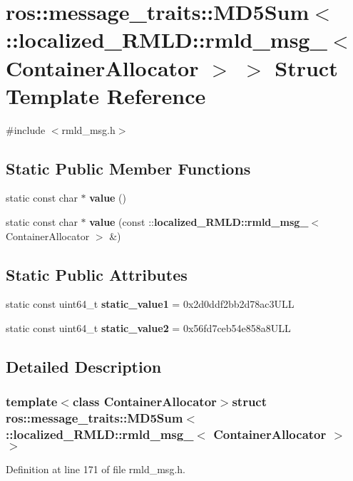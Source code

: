 \section{ros::message\_\-traits::MD5Sum$<$ ::localized\_\-RMLD::rmld\_\-msg\_\-$<$ ContainerAllocator $>$ $>$ Struct Template Reference}
\label{structros_1_1message__traits_1_1MD5Sum_3_01_1_1localized__RMLD_1_1rmld__msg___3_01ContainerAllocator_01_4_01_4}


{\ttfamily \#include $<$rmld\_\-msg.h$>$}

\subsection*{Static Public Member Functions}
\begin{DoxyCompactItemize}
\item 
static const char $\ast$ {\bf value} ()
\item 
static const char $\ast$ {\bf value} (const ::{\bf localized\_\-RMLD::rmld\_\-msg\_\-}$<$ ContainerAllocator $>$ \&)
\end{DoxyCompactItemize}
\subsection*{Static Public Attributes}
\begin{DoxyCompactItemize}
\item 
static const uint64\_\-t {\bf static\_\-value1} = 0x2d0ddf2bb2d78ac3ULL
\item 
static const uint64\_\-t {\bf static\_\-value2} = 0x56fd7ceb54e858a8ULL
\end{DoxyCompactItemize}


\subsection{Detailed Description}
\subsubsection*{template$<$class ContainerAllocator$>$struct ros::message\_\-traits::MD5Sum$<$ ::localized\_\-RMLD::rmld\_\-msg\_\-$<$ ContainerAllocator $>$ $>$}



Definition at line 171 of file rmld\_\-msg.h.



